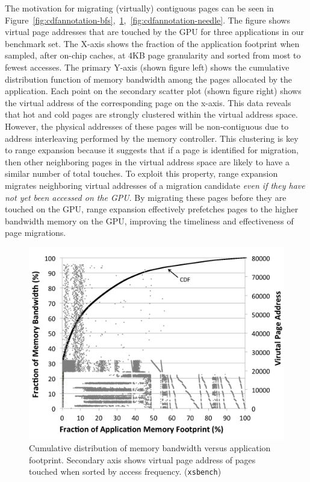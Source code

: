 The motivation for migrating (virtually) contiguous pages can be seen in
Figure~\ref{fig:cdfannotation-bfs},~\ref{fig:cdfannotation-xsbench},~\ref{fig:cdfannotation-needle}. The figure shows virtual page addresses that are
touched by the GPU for three applications in our benchmark set.
The X-axis shows the fraction of the application footprint when
sampled, after on-chip caches, at 4KB page granularity and sorted from
{\color{black}most to fewest accesses.
The primary Y-axis (shown figure left) shows the cumulative distribution
function of memory bandwidth among the pages allocated by the application.
Each point on the secondary scatter
plot (shown figure right) shows the virtual address of the corresponding page on
the x-axis. This data reveals that hot and cold pages are strongly clustered within the
virtual address space.  However, the physical addresses of these pages will be
non-contiguous due to address interleaving performed by the memory controller.
} This clustering
is key to range expansion because it suggests that if a page is identified for migration, then other 
neighboring pages in the virtual address space are likely to have a similar number of total touches.  
To exploit this property,
range expansion migrates neighboring virtual addresses of a migration candidate \emph{even if they
have not yet been accessed on the GPU}\@.  By migrating these pages before they are touched on the GPU, range
expansion effectively prefetches pages to the higher bandwidth memory on the GPU, 
improving the timeliness and effectiveness of page migrations.  

\begin{figure}[t]
    \centering
    \includegraphics[width=0.9\columnwidth]{hpca2015/figures/xsbenchannotated.png}
    \caption{Cumulative distribution of memory bandwidth versus application footprint.  Secondary axis
    shows virtual page address of pages touched when sorted by access frequency. ({\tt xsbench})}
    \label{fig:cdfannotation-xsbench}
\end{figure}

